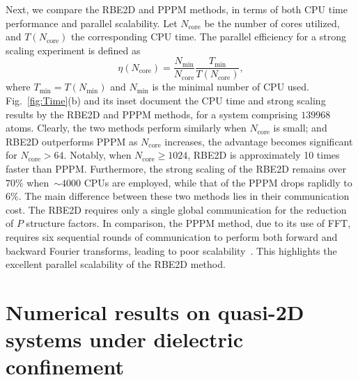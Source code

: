 Next, we compare the RBE2D and PPPM methods, in terms of both
CPU time performance and  {parallel} scalability. %
Let  {$N_{\text{core}}$ be the number of cores utilized}, and $T(N_{\text{core}})$ the corresponding CPU time.  {The parallel efficiency for a strong scaling experiment is defined as}
\begin{equation}\label{eq::etau}
\eta(N_{\text{core}})=\frac{N_{\text{min}}}{N_{\text{core}}}\frac{T_{\text{min}}}{T(N_{\text{core}})},
\end{equation}
where $T_{\text{min}}=T(N_{\text{min}})$ and $N_{\text{min}}$ is the minimal number of CPU used. 
Fig.~\ref{fig:Time}(b) and its inset document the CPU time and strong scaling results by the RBE2D and PPPM methods, for a system comprising $139968$ atoms. Clearly,
the two methods perform similarly when $N_{\text{core}}$ is small; and RBE2D outperforms PPPM as $N_{\text{core}}$ increases, the advantage becomes significant for $N_{\text{core}}>64$. Notably,
when $N_{\text{core}}\geq 1024$, RBE2D is approximately 10 times faster than PPPM. 
Furthermore, the strong scaling of the RBE2D remains over $70\%$ when~$\sim 4000$ CPUs are employed, while that of the PPPM drops raplidly to $6\%$. 
 {The main difference between these two methods lies in their communication cost. The RBE2D requires only a single global communication for the reduction of $P$ structure factors. In comparison, the PPPM method, due to its use of FFT, requires six sequential rounds of communication to perform both forward and backward Fourier transforms, leading to poor scalability~\cite{fftscalability,arnold2013comparison}.} This highlights the excellent parallel scalability of the RBE2D method. 


\section{Numerical results on quasi-2D systems under dielectric confinement}\label{sec::numericalDielectric}

